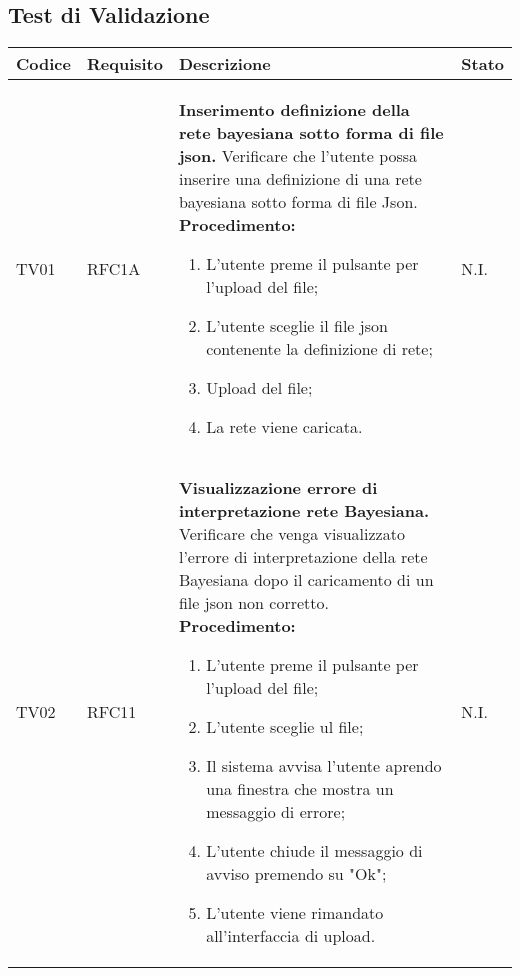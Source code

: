 \subsection{Test di Validazione}
\begin{table}[!htpb]
	\centering
	\renewcommand{\arraystretch}{2} 
	\begin{tabular}{|l|l|p{10cm}|l|}
		\rowcolor{orange!50}
		\hline
		\textbf{Codice} & \textbf{Requisito}& \textbf{Descrizione} & \textbf{Stato}\\ 
		\hline
		TV01 & RFC1A & 
			\textbf{Inserimento definizione della rete bayesiana sotto forma di file json.}
			\newline
			Verificare che l'utente possa inserire una definizione di una rete bayesiana sotto forma di file Json.
			\newline
			\textbf{Procedimento:}
			\begin{enumerate} 
				\item L’utente preme il pulsante per l’upload del file; 
				\item L’utente sceglie il file json contenente la definizione di rete; 
				\item Upload del file; 
				\item La rete viene caricata. 
			\end{enumerate}
			& N.I.\\
		\hline
		TV02 & RFC11 & 
			\textbf{Visualizzazione errore di interpretazione rete Bayesiana.} 
			\newline 
			Verificare che venga visualizzato l'errore di interpretazione della rete Bayesiana dopo il caricamento di un file json non corretto. 
			\newline 
			\textbf{Procedimento: } 
			\begin{enumerate} 
				\item L’utente preme il pulsante per l’upload del file; 
				\item L’utente sceglie ul file; 
				\item Il sistema avvisa l'utente aprendo una finestra che mostra un messaggio di errore; 
				\item L'utente chiude il messaggio di avviso premendo su "Ok"; 
				\item L'utente viene rimandato all'interfaccia di upload. 
			\end{enumerate} 
			& N.I.\\
		\hline
	\end{tabular}
\end{table}
